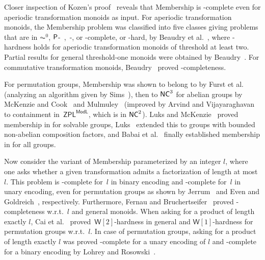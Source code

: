 Closer inspection of Kozen's proof~\cite[Thm.~3.2.6]{Kozen77} reveals that
{\sc Membership} is \PSPACE-complete even 
for aperiodic transformation monoids as input.
For aperiodic transformation monoids, the {\sc Membership} problem
was classified into five classes giving problems that are in $\AC^0$,
$\textup{\textsf{P}}$-~,~\NP-, or \PSPACE-complete, or \NP-hard, by Beaudry et al.~\cite{DBLP:journals/jacm/BeaudryMT92},
where \NP-hardness holds for aperiodic transformation monoids
of threshold at least two. Partial results
for general threshold-one monoids were obtained by Beaudry~\cite{DBLP:journals/iandc/Beaudry94}.
For commutative transformation monoids, 
Beaudry~\cite{DBLP:journals/iandc/Beaudry88} proved \NP-completeness.

For permutation groups, {\sc Membership}
was shown to belong to \PTIME by Furst et al.~\cite{DBLP:conf/focs/FurstHL80} (analyzing an algorithm given by Sims~\cite{Sims70}),
then to $\textup{\textsf{NC}}^3$ for abelian groups by McKenzie and Cook~\cite{DBLP:journals/siamcomp/McKenzieC87} 
and Mulmuley~\cite{DBLP:journals/combinatorica/Mulmuley87} 
(improved 
by Arvind and Vijayaraghavan~\cite{DBLP:conf/coco/ArvindV04} 
to containment in~$\textsf{ZPL}^{\textsf{ModL}}$,
which is in $\textup{\textsf{NC}}^2$).
Luks and McKenzie~\cite{DBLP:journals/jcss/LuksM88} proved membership in \NC for solvable groups, Luks~\cite{DBLP:conf/focs/Luks86} extended this to groups with bounded non-abelian composition factors, and Babai et al.~\cite{DBLP:conf/stoc/BabaiLS87} finally established membership in \NC for all groups.

Now consider the variant of {\sc Membership} parameterized by an integer $l$, 
where one asks whether a given transformation admits a factorization of length at most $l$.
This problem is \PSPACE-complete for~$l$ in binary encoding
and \NP-complete for~$l$ in unary encoding, even for permutation
groups as shown by Jerrum~\cite[Thm.~2.2]{DBLP:journals/tcs/Jerrum85} 
and Even and Goldreich~\cite[Thm.~1]{DBLP:journals/jal/EvenG81}, respectively.
Furthermore, Fernau and Bruchertseifer~\cite{DBLP:journals/mscs/FernauB22}
proved \WSYNC-completeness w.r.t.~$l$ and general monoids.
When asking for a product of length exactly $l$,
Cai et al.~\cite[Thm.~6 \& 7]{DBLP:journals/aml/CaiCDF97} proved~$\textsf{W}[2]$-hardness
in general and $\textsf{W}[1]$-hardness for permutation groups w.r.t.~$l$.
In case of permutation groups, asking
for a product of length exactly $l$
was proved  \DP-complete for a unary encoding of $l$
and \PSPACE-complete
for a binary encoding by Lohrey and Rosowski~\cite[Thm.~4.2 \& 4.3]{DBLP:conf/icalp/LohreyR23}.

